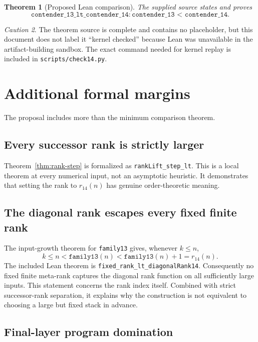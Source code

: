 \documentclass[11pt]{article}
\newtheorem{theorem}{Theorem}[section]
\theoremstyle{definition}
\theoremstyle{remark}
\newtheorem{caution}[theorem]{Caution}
\newcommand{\lean}[1]{\texttt{#1}}
\begin{document}
\begin{theorem}[Proposed Lean comparison]
The supplied source states and proves
\[
  \lean{contender\_13\_lt\_contender\_14}:
  \lean{contender\_13 < contender\_14}.
\]
\end{theorem}

\begin{caution}
The theorem source is complete and contains no placeholder, but this document
does not label it ``kernel checked'' because Lean was unavailable in the
artifact-building sandbox.  The exact command needed for kernel replay is
included in \lean{scripts/check14.py}.
\end{caution}

\section{Additional formal margins}

The proposal includes more than the minimum comparison theorem.

\subsection{Every successor rank is strictly larger}

Theorem~\ref{thm:rank-step} is formalized as
\lean{rankLift\_step\_lt}.  This is a local theorem at every numerical input,
not an asymptotic heuristic.  It demonstrates that setting the rank to
\(r_{14}(n)\) has genuine order-theoretic meaning.

\subsection{The diagonal rank escapes every fixed finite rank}

The input-growth theorem for \lean{family13} gives, whenever \(k\le n\),
\[
  k\le n<\lean{family13}(n)<\lean{family13}(n)+1=r_{14}(n).
\]
The included Lean theorem is
\lean{fixed\_rank\_lt\_diagonalRank14}.  Consequently no fixed finite
meta-rank captures the diagonal rank function on all sufficiently large
inputs.  This statement concerns the rank index itself.  Combined with strict
successor-rank separation, it explains why the construction is not equivalent
to choosing a large but fixed stack in advance.

\subsection{Final-layer program domination}
\end{document}
